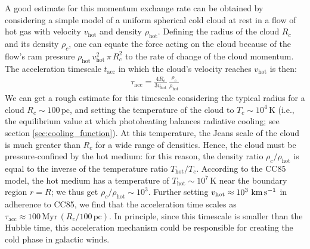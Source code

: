 A good estimate for this momentum exchange rate can be obtained by considering a simple model of a uniform spherical cold cloud at rest in a flow of hot gas with velocity $v_\mathrm{hot}$ and density $\rho_\mathrm{hot}$. Defining the radius of the cloud $R_c$ and its density $\rho_c$, one can equate the force acting on the cloud because of the flow's ram pressure $\rho_\mathrm{hot}\,v_\mathrm{hot}^2 \,\pi\,R_c^2$ to the rate of change of the cloud momentum. The acceleration timescale $t_\mathrm{acc}$ in which the cloud's velocity reaches $v_\mathrm{hot}$ is then:
\begin{align}
       \tau_\mathrm{acc} = \frac{4R_c}{3v_\mathrm{hot}}\,\frac{\rho_c}{\rho_\mathrm{hot}}
\end{align}
We can get a rough estimate for this timescale considering the typical radius for a cloud $R_c \sim 100\,\mathrm{pc}$, and setting the temperature of the cloud to $T_c \sim 10^4\,\mathrm{K}$ (i.e., the equilibrium value at which photoheating balances radiative cooling; see section \ref{sec:cooling_function}). At this temperature, the Jeans scale of the cloud is much greater than $R_c$ for a wide range of densities. Hence, the cloud must be pressure-confined by the hot medium: for this reason, the density ratio $\rho_c/\rho_\mathrm{hot}$ is equal to the inverse of the temperature ratio $T_\mathrm{hot}/T_c$. According to the CC85 model, the hot medium has a temperature of $T_\mathrm{hot}\sim 10^7\,\mathrm{K}$ near the boundary region $r=R$; we thus get $\rho_c / \rho_\mathrm{hot} \sim 10^3$. Further setting $v_\mathrm{hot} \approx 10^3 \,\,\rm km\,s^{-1}$ in adherence to CC85, we find that the acceleration time scales as $\tau_\mathrm{acc}\approx 100\,\mathrm{Myr}\, (R_c/100\,\mathrm{pc})$. In principle, since this timescale is smaller than the Hubble time, this acceleration mechanism could be responsible for creating the cold phase in galactic winds.

